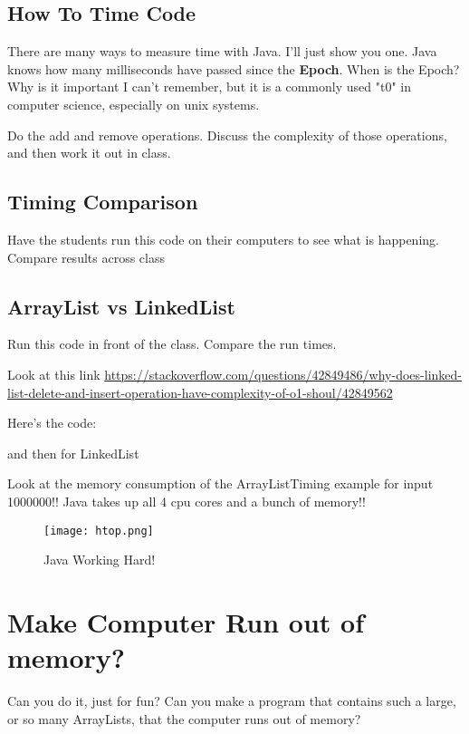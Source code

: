 \documentclass[12pt]{article}
\begin{document}
\subsection{How To Time Code}
There are many ways to measure time with Java. I'll just show you one. Java knows how many milliseconds have passed since the \textbf{Epoch}. When is the Epoch? Why is it important I can't remember, but it is a commonly used "t0" in computer science, especially on unix systems. 

Do the add and remove operations. Discuss the complexity of those operations, and then work it out in class.

\subsection{Timing Comparison}

Have the students run this code on their computers to see what is happening. Compare results across class



\subsection{ArrayList vs LinkedList}
Run this code in front of the class. Compare the run times.

Look at this link
\url{https://stackoverflow.com/questions/42849486/why-does-linked-list-delete-and-insert-operation-have-complexity-of-o1-shoul/42849562}

Here's the code:



and then for LinkedList



Look at the memory consumption of the ArrayListTiming example for input 1000000!! Java takes up all 4 cpu cores and a bunch of memory!!

\begin{figure}[h]
  \centering
    \texttt{[image: htop.png]}
  \caption{Java Working Hard!}
\end{figure}


\section{Make Computer Run out of memory?}
Can you do it, just for fun? Can you make a program that contains such a large, or so many ArrayLists, that the computer runs out of memory?
\end{document}
